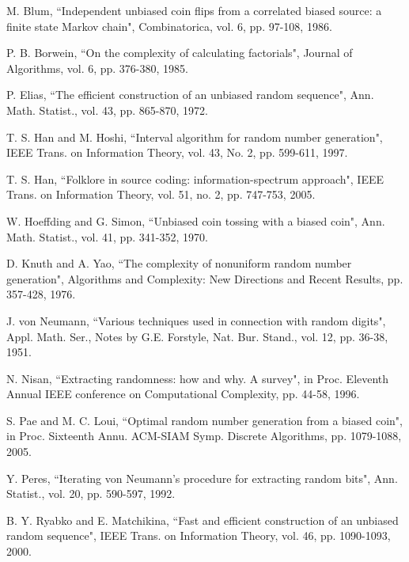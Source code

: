 \documentclass[journal]{IEEEtran}
\begin{document}
\begin{thebibliography}{1}

M. Blum, ``Independent unbiased coin flips from a correlated biased source: a finite state Markov chain", Combinatorica, vol. 6, pp. 97-108, 1986.

P. B. Borwein, ``On the complexity of calculating factorials", Journal of Algorithms, vol. 6, pp. 376-380, 1985.

P. Elias, ``The efficient construction of an unbiased random sequence", Ann. Math. Statist., vol. 43, pp. 865-870, 1972.

T. S. Han and M. Hoshi, ``Interval algorithm for random number generation", IEEE Trans. on Information Theory, vol. 43, No. 2, pp. 599-611, 1997.

T. S. Han, ``Folklore in source coding: information-spectrum approach",
IEEE Trans. on Information Theory, vol. 51, no. 2,  pp. 747-753, 2005.

W. Hoeffding and G. Simon, ``Unbiased coin tossing with a biased coin", Ann. Math. Statist., vol. 41, pp. 341-352, 1970.

D. Knuth and A. Yao, ``The complexity of nonuniform random number generation", Algorithms and Complexity: New Directions and Recent Results, pp. 357-428, 1976.

J. von Neumann, ``Various techniques used in connection with random digits", Appl. Math.
Ser., Notes by G.E. Forstyle, Nat. Bur. Stand., vol. 12, pp. 36-38, 1951.

N. Nisan, ``Extracting randomness: how and why. A survey", in Proc. Eleventh Annual IEEE conference on Computational Complexity, pp. 44-58, 1996.


S. Pae and M. C. Loui, ``Optimal random number generation from a
biased coin", in Proc. Sixteenth Annu. ACM-SIAM Symp. Discrete Algorithms, pp. 1079-1088, 2005.


Y. Peres, ``Iterating von Neumann's procedure for extracting random bits", Ann. Statist., vol. 20, pp. 590-597, 1992.

B. Y. Ryabko and E. Matchikina, ``Fast and efficient construction of an unbiased random sequence", IEEE Trans. on
Information Theory, vol. 46, pp. 1090-1093, 2000.


\end{thebibliography}
\end{document}
